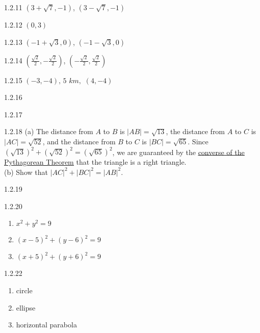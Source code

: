\begin{Answer}{1.2.11}
$(3 + \sqrt{7}, -1)$, $(3-\sqrt{7}, -1)$
\end{Answer}
\begin{Answer}{1.2.12}
	$(0,3)$
\end{Answer}
\begin{Answer}{1.2.13}
$(-1+\sqrt{3},0)$, $(-1-\sqrt{3},0)$ 
\end{Answer}
\begin{Answer}{1.2.14}
	$\left(\frac{\sqrt{2}}{2},-\frac{\sqrt{2}}{2} \right)$, $\left(-\frac{\sqrt{2}}{2},\frac{\sqrt{2}}{2}\right)$
\end{Answer}
\begin{Answer}{1.2.15}
 	$(-3,-4), \, 5 \,\, km, \,\, (4, -4)$
 
\end{Answer}
\begin{Answer}{1.2.16}


\end{Answer}
\begin{Answer}{1.2.17}

\end{Answer}
\begin{Answer}{1.2.18}
	(a) The distance from $A$ to $B$ is $|AB| = \sqrt{13}$, the distance from $A$ to $C$ is $|AC| = \sqrt{52}$, and the distance from $B$ to $C$ is $|BC| = \sqrt{65}$.  Since $\left(\sqrt{13}\right)^2 + \left( \sqrt{52} \right)^2 = \left( \sqrt{65} \right)^2$, we are guaranteed by the \href{http://en.wikipedia.org/wiki/Pythagorean_theorem#Converse}{\underline{converse of the Pythagorean Theorem}} that the triangle is a right triangle.\\
	(b) Show that $|AC|^{2} + |BC|^{2} = |AB|^{2}$.
\end{Answer}
\begin{Answer}{1.2.19}

\end{Answer}
\begin{Answer}{1.2.20}
\begin{enumerate}
	\item	$x^2+y^2=9$
	\item	$(x-5)^2+(y-6)^2=9$
	\item	$(x+5)^2+(y+6)^2=9$
\end{enumerate}
\end{Answer}
\begin{Answer}{1.2.22}
\begin{enumerate}
	\item	circle
	\item	ellipse
	\item	horizontal parabola
\end{enumerate}
\end{Answer}
